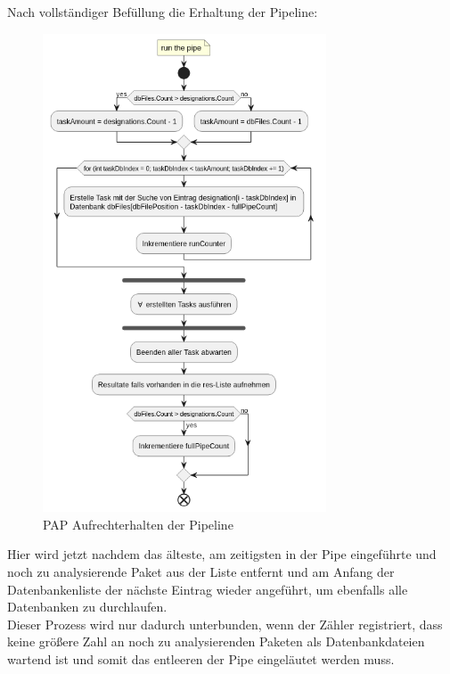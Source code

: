     \newpage
    Nach vollständiger Befüllung die Erhaltung der Pipeline:
    \begin{figure}[H]
        \centering
        \includegraphics[width=0.75\textwidth]{../pap/Case_B_k.png}
        \caption{\ac{PAP} Aufrechterhalten der Pipeline}
        \label{png:case_b}
    \end{figure}
    \noindent Hier wird jetzt nachdem das älteste, am zeitigsten in der Pipe eingeführte und noch zu analysierende Paket aus der Liste entfernt und am Anfang der Datenbankenliste der nächste Eintrag wieder angeführt, um ebenfalls alle Datenbanken zu durchlaufen.
    \\
    Dieser Prozess wird nur dadurch unterbunden, wenn der Zähler registriert, dass keine größere Zahl an noch zu analysierenden Paketen als Datenbankdateien wartend ist und somit das entleeren der Pipe eingeläutet werden muss.

